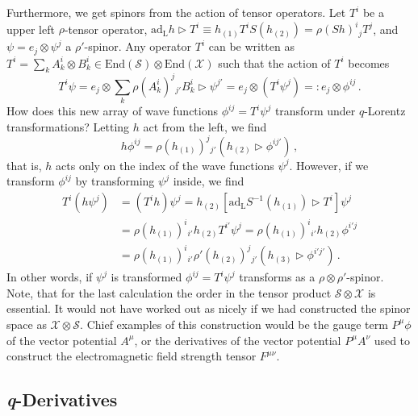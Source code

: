 \documentclass[12pt,a4paper]{article}
\newcommand{\tr}{\triangleright}
\newcommand{\adL}{{\mathrm{ad_L}}}
\newcommand{\Xcal}{\mathcal{X}}
\newcommand{\Scal}{\mathcal{S}}
\begin{document}
Furthermore, we get spinors from the action of tensor operators. Let
$T^i$ be a upper left $\rho$-tensor operator, $\adL h \tr T^i \equiv
h_{(1)} T^i S(h_{(2)}) = \rho(Sh)^i{}_j T^j$, and $\psi = e_j \otimes
\psi^j$ a $\rho'$-spinor. Any operator $T^i$ can be written as $T^i =
\sum_k A_k^i \otimes B_k^i \in \mathrm{End}(\Scal)\otimes
\mathrm{End}(\Xcal)$ such that the action of $T^i$ becomes
\begin{equation}
  T^i \psi
  = e_j \otimes \sum_k \rho(A_k^i)^j{}_{j'} B_k^i \tr \psi^{j'}
  = e_j \otimes (T^i \psi^j) =: e_j \otimes  \phi^{ij} \,.
\end{equation}
How does this new array of wave functions $\phi^{ij} = T^i\psi^j$
transform under $q$-Lorentz transformations? Letting $h$ act from the
left, we find
\begin{equation}
  h\phi^{ij} = \rho(h_{(1)})^j{}_{j'}(h_{(2)}\tr \phi^{ij'}) \,,
\end{equation}
that is, $h$ acts only on the index of the wave functions $\psi^j$.
However, if we transform $\phi^{ij}$ by transforming $\psi^j$ inside,
we find
\begin{equation}
\begin{split}
  T^i (h\psi^j) &= (T^i h)\psi^j 
  = h_{(2)}  [ \adL S^{-1}(h_{(1)}) \tr T^i ] \psi^{j} \\ 
  &= \rho(h_{(1)})^i{}_{i'}  h_{(2)}T^{i'} \psi^{j} 
  = \rho(h_{(1)})^i{}_{i'}  h_{(2)} \phi^{i'j} \\
  &= \rho(h_{(1)})^i{}_{i'} \rho'(h_{(2)})^j{}_{j'} 
     (h_{(3)} \tr \phi^{i'j'})  \,.
\end{split}
\end{equation}
In other words, if $\psi^j$ is transformed $\phi^{ij} = T^i\psi^j$
transforms as a $\rho\otimes\rho'$-spinor. Note, that for the last
calculation the order in the tensor product $\Scal\otimes \Xcal$ is
essential. It would not have worked out as nicely if we had
constructed the spinor space as $\Xcal\otimes\Scal$. Chief examples of
this construction would be the gauge term $P^\mu\phi$ of the vector
potential $A^\mu$, or the derivatives of the vector potential $P^\mu
A^\nu$ used to construct the electromagnetic field strength tensor
$F^{\mu\nu}$.


\subsection{\textit{q}-Derivatives}
\end{document}
